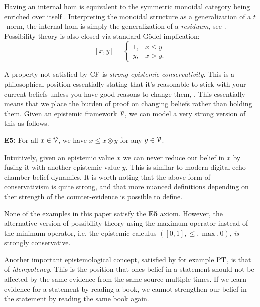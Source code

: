 Having an internal hom is equivalent to the symmetric monoidal category being enriched over itself \cite[Section 1.6]{kelly_1982}. Interpreting the monoidal structure as a generalization of a $t$-norm, the internal hom is simply the generalization of a \emph{residuum}, see \cite{klement-mesiar-pap_2000}. Possibility theory is also closed via standard Gödel implication: 
\[[x,y] = 
\begin{cases}
    1, & x \leq y \\
    y, & x > y.
\end{cases}
\]

A property not satisfied by $\mathrm{CF}$ is \emph{strong epistemic conservativity}. This is a philosophical position essentially stating that it's reasonable to stick with your current beliefs unless you have good reasons to change them, \cite{mccain_2008}. This essentially means that we place the burden of proof on changing beliefs rather than holding them. Given an epistemic framework $\EuScript{V}$, we can model a very strong version of this as follows.

\textbf{E5:} For all $x\in \EuScript{V}$, we have $x\leq x\otimes y$ for any $y \in \EuScript{V}$.

Intuitively, given an epistemic value $x$ we can never reduce our belief in $x$ by fusing it with another epistemic value $y$. This is similar to modern digital echo-chamber belief dynamics. It is worth noting that the above form of conservativism is quite strong, and that more nuanced definitions depending on ther strength of the counter-evidence is possible to define.  

\begin{remark}
    None of the examples in this paper satisfy the \textbf{E5} axiom. However, the alternative version of possibility theory using the maximum operator instead of the minimum operator, i.e. the epistemic calculus $([0,1], \leq, \max, 0)$, \emph{is} strongly conservative.
\end{remark}


Another important epistemological concept, satisfied by for example $\mathrm{PT}$, is that of \emph{idempotency}. This is the position that ones belief in a statement should not be affected by the same evidence from the same source multiple times. If we learn evidence for a statement by reading a book, we cannot strengthen our belief in the statement by reading the same book again.  

